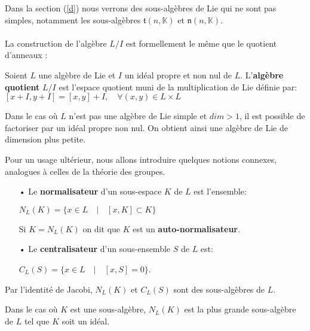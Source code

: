 \documentclass[a4paper,openany,12pt]{report}
\newcommand{\KK}{\mathbb{K}}
\newcommand{\ttt}{\mathfrak{t}}
\newcommand{\nn}{\mathfrak{n}}
\theoremstyle{break}
{\theorembodyfont{\upshape}
\newtheorem*{rmq}{Remarque :}
\newtheorem*{prv}{Preuve :}
\newtheorem*{ex}{Exemples :}
\newtheorem*{exe}{Exemple : }
\newtheorem*{nota}{Notation :}
\newtheorem*{dem}{D\'emonstration :}}
\begin{document}
Dans la section (\ref{d}) nous verrons des sous-algèbres de Lie qui ne sont pas simples, notamment les sous-algèbres $\ttt(n,\KK)$ et $\nn(n,\KK)$.\\
\\

La construction de l'algèbre $L/I$ est formellement le même que le quotient d'anneaux :

\begin{df}
\quad Soient $L$ une algèbre de Lie et $I$ un idéal propre et non nul de $L$. L'\textbf{algèbre quotient} $L/I$ est l'espace quotient muni de la multiplication de Lie définie par:
\center $[x+I, y+I]=[x, y]+I, \quad \forall(x, y) \in L \times L$
\end{df}

\begin{rmq}
\quad Dans le cas où $L$ n'est pas une algèbre de Lie simple et $dim>1$, il est possible de factoriser par un idéal propre non nul. On obtient ainsi une algèbre de Lie de dimension plus petite.
\end{rmq}

Pour un usage ultérieur, nous allons introduire quelques notions connexes, analogues à celles de la théorie des groupes.

\begin{df}
\begin{itemize}

\item[•] Le \textbf{normalisateur} d'un sous-espace $K$ de $L$ est l'ensemble:  
 \begin{center}
$ N_{L}(K)=\{x \in L \quad |\quad [x,K] \subset K \} $ 
 \end{center}
Si $K = N_{L}(K)$ on dit que $K$ est un \textbf{auto-normalisateur}.

\item[•] Le \textbf{centralisateur} d'un sous-ensemble $S$ de $L$ est:
\begin{center}
$C_{L}(S) = \{x \in L\quad  | \quad [x,S]=0\}$.

\end{center} 
\end{itemize}
\end{df}

\begin{rmq} 
\quad Par l’identité de Jacobi, $N_L(K)$ et $C_L(S)$ sont des sous-algèbres de $L$.

Dans le cas où $K$ est une sous-algèbre, $N_{L}(K)$ est la plus grande sous-algèbre de $L$ tel que $K$ soit un idéal.
\end{rmq}
\end{document}
